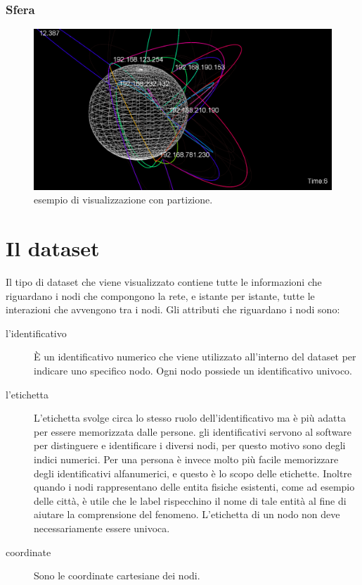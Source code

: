 \documentclass[a4paper,12pt]{article}
\begin{document}
\subsubsection{Sfera}

\begin{figure}[htb!]
 \begin{center}
  \includegraphics[width=\textwidth]{images/image5.png}
 \end{center}
 \caption{esempio di visualizzazione con  partizione.}
 \label{fig:slider}
\end{figure}
 
\section{Il dataset}
Il tipo di dataset che viene visualizzato contiene tutte le informazioni che riguardano i nodi che compongono la rete, e istante per istante, tutte le interazioni che avvengono tra i nodi.
Gli attributi che riguardano i nodi sono:
\begin{description}
 \item[l'identificativo] \`E un identificativo numerico che viene utilizzato all'interno del dataset per indicare uno specifico nodo. Ogni nodo possiede un identificativo univoco.
 \item[l'etichetta] L'etichetta svolge circa lo stesso ruolo dell'identificativo ma \`e più adatta per essere memorizzata dalle persone. gli identificativi servono al software per distinguere e identificare i diversi nodi, per questo motivo sono degli indici numerici. Per una persona \`e invece molto più facile memorizzare degli identificativi alfanumerici, e questo \`e lo scopo delle etichette. Inoltre quando i nodi rappresentano delle entita fisiche esistenti, come ad esempio delle città, \`e utile che le label rispecchino il nome di tale entità al fine di aiutare la comprensione del fenomeno. L'etichetta di un nodo non deve necessariamente essere univoca.
 \item[coordinate] Sono le coordinate cartesiane dei nodi.
\end{description}
\end{document}
